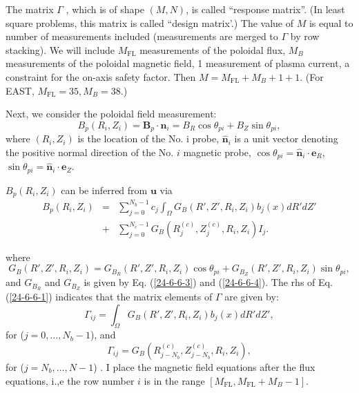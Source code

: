 \documentclass{llncs}
\newcommand{\tmop}[1]{\ensuremath{\operatorname{#1}}}
\begin{document}
The matrix $\Gamma$ , which is of shape $(M, N)$, is called ``response
matrix''. (In least square problems, this matrix is called ``design matrix'.)
The value of $M$ is equal to number of measurements included (measurements are
merged to $\Gamma$ by row stacking). We will include $M_{\tmop{FL}}$
measurements of the poloidal flux, $M_B$ measurements of the poloidal magnetic
field, 1 measurement of plasma current, a constraint for the on-axis safety
factor. Then $M = M_{\tmop{FL}} + M_B + 1 + 1$. (For EAST, $M_{\tmop{FL}} =
35, M_B = 38$.)

Next, we consider the poloidal field measurement:
\begin{equation}
  B_p (R_i, Z_i) =\mathbf{B}_p \cdot \hat{\mathbf{n}}_i = B_R \cos \theta_{p
  i} + B_Z \sin \theta_{p i},
\end{equation}
where $(R_i, Z_i)$ is the location of the No. i probe, $\hat{\mathbf{n}}_i$ is
a unit vector denoting the positive normal direction of the No. $i$ magnetic
probe, $\cos \theta_{p i} = \hat{\mathbf{n}}_i \cdot \mathbf{e}_R$, $\sin
\theta_{p i} = \hat{\mathbf{n}}_i \cdot \mathbf{e}_Z$.

$B_p (R_i, Z_i)$ can be inferred from $\mathbf{u}$ via
\begin{eqnarray}
  B_p  (R_i, Z_i) & = & \sum_{j = 0}^{N_b - 1} c_j \int_{\Omega} G_B (R', Z',
  R_i, Z_i) b_j (x) d R' d Z' \nonumber\\
  & + & \sum_{j = 0}^{N_c - 1} G_B (R_j^{(c)}, Z_j^{(c)}, R_i, Z_i) I_j . 
  \label{24-6-6-1}
\end{eqnarray}


where
\begin{equation}
  G_B (R', Z', R_i, Z_i) = G_{B_R} (R', Z', R_i, Z_i) \cos \theta_{p i} +
  G_{B_Z} (R', Z', R_i, Z_i) \sin \theta_{p i},
\end{equation}
and $G_{B_R}$ and $G_{B_Z}$ is given by Eq. (\ref{24-6-6-3}) and
(\ref{24-6-6-4}). The rhs of Eq. (\ref{24-6-6-1}) indicates that the matrix
elements of $\Gamma$ are given by:
\begin{equation}
  \Gamma_{i j} = \int_{\Omega} G_B (R', Z', R_i, Z_i) b_j (x) d R' d Z',
\end{equation}
for  ($j = 0, \ldots, N_b - 1$), and
\begin{equation}
  \Gamma_{i j} = G_B (R_{j - N_b}^{(c)}, Z_{j - N_b}^{(c)}, R_i, Z_i),
\end{equation}
for  ($j = N_b, \ldots, N - 1$) . I place the magnetic field equations after
the flux equations, i.,e the row number $i$ is in the range $[M_{\tmop{FL}},
M_{\tmop{FL}} + M_B - 1]$.
\end{document}
